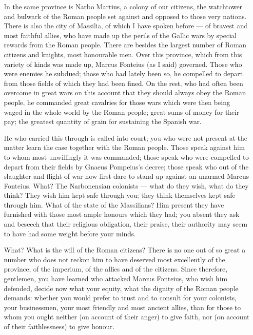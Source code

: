  In the same province is Narbo Martius, a colony of our citizens, the watchtower and bulwark of the Roman people set against and opposed to those very nations. There is also the city of Massilia, of which I have spoken before --- of bravest and most faithful allies, who have made up the perils of the Gallic wars by special rewards from the Roman people. There are besides the largest number of Roman citizens and knights, most honourable men. Over this province, which from this variety of kinds was made up, Marcus Fonteius (as I said) governed. Those who were enemies he subdued; those who had lately been so, he compelled to depart from those fields of which they had been fined. On the rest, who had often been overcome in great wars on this account that they should always obey the Roman people, he commanded great cavalries for those wars which were then being waged in the whole world by the Roman people; great sums of money for their pay; the greatest quantity of grain for sustaining the Spanish war.

 He who carried this through is called into court; you who were not present at the matter learn the case together with the Roman people. Those speak against him to whom most unwillingly it was commanded; those speak who were compelled to depart from their fields by Gnaeus Pompeius's decree; those speak who out of the slaughter and flight of war now first dare to stand up against an unarmed Marcus Fonteius. What? The Narbonensian colonists --- what do they wish, what do they think? They wish him kept safe through you; they think themselves kept safe through him. What of the state of the Massilians? Him present they have furnished with those most ample honours which they had; you absent they ask and beseech that their religious obligation, their praise, their authority may seem to have had some weight before your minds.

 What? What is the will of the Roman citizens? There is no one out of so great a number who does not reckon him to have deserved most excellently of the province, of the imperium, of the allies and of the citizens. Since therefore, gentlemen, you have learned who attacked Marcus Fonteius, who wish him defended, decide now what your equity, what the dignity of the Roman people demands: whether you would prefer to trust and to consult for your colonists, your businessmen, your most friendly and most ancient allies, than for those to whom you ought neither (on account of their anger) to give faith, nor (on account of their faithlessness) to give honour.

